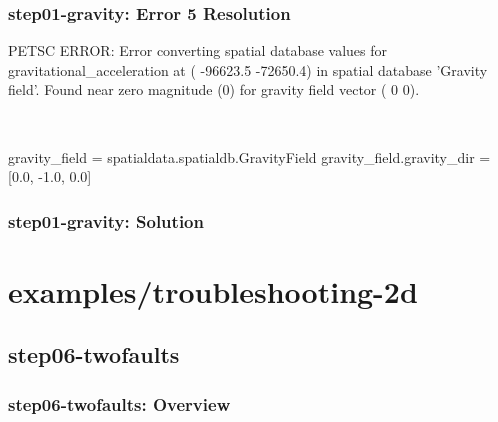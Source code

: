 \documentclass[aspectratio=169]{beamer}
\begin{document}
\begin{frame}[t,fragile]
  \frametitle{{\ttfamily step01-gravity}: Error 5 Resolution}

  \tserror
  \begin{bashcode}
[0]PETSC ERROR: Error converting spatial database values for gravitational_acceleration at (  -96623.5  -72650.4) in
spatial database 'Gravity field'. Found near zero magnitude (0) for gravity field vector (  0  0).
  \end{bashcode}

  \pause\\[1pt]

  \begin{cfgcode}
    gravity_field = spatialdata.spatialdb.GravityField
    gravity_field.gravity_dir = [0.0, -1.0, 0.0]
  \end{cfgcode}

\end{frame}


\begin{frame}[fragile]
  \frametitle{{\ttfamily step01-gravity}: Solution}

  
\end{frame}


\section{{\ttfamily examples/troubleshooting-2d}}
\subsection{{\ttfamily step06-twofaults}}

\begin{frame}[fragile]
  \frametitle{{\ttfamily step06-twofaults}: Overview}


  
\end{frame}
\end{document}
